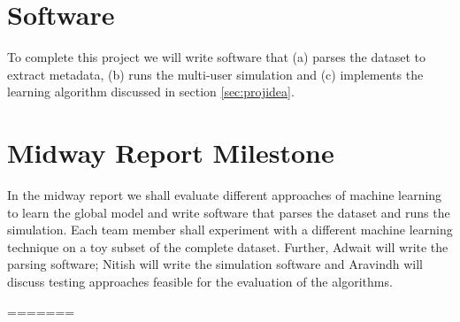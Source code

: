 \documentclass{article} %
\newcommand{\fix}{\marginpar{FIX}}
\newcommand{\new}{\marginpar{NEW}}
\begin{document}
\section{Software}
\vspace{-0.125in}
To complete this project we will write software that (a) parses the dataset to extract metadata, (b) runs the multi-user simulation and (c) implements the learning algorithm discussed in section \ref{sec:projidea}.
\vspace{-0.125in}
\section{Midway Report Milestone}
\vspace{-0.125in}
In the midway report we shall evaluate different approaches of machine learning to learn the global model and write software that parses the dataset and runs the simulation. Each team member shall experiment with a different machine learning technique on a toy subset of the complete dataset. Further, Adwait will write the parsing software; Nitish will write the simulation software and Aravindh will discuss testing approaches feasible for the evaluation of the algorithms.

\nocite{personalizingimagesearchresults}
\nocite{lornet}
\nocite{Sebastiani:2002:MLA:505282.505283}



=======
\newcommand{\fix}{\marginpar{FIX}}
\newcommand{\new}{\marginpar{NEW}}

\nipsfinalcopy
\end{document}
